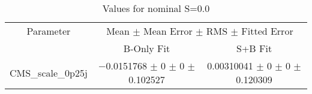 \begin{table}
\centering
\caption{Values for nominal S=0.0}
\begin{tabular}{ccc}
\toprule
Parameter & \multicolumn{2}{c}{Mean $\pm$ Mean Error $\pm$ RMS $\pm$ Fitted Error}\\
 & B-Only Fit & S+B Fit\\
\midrule
CMS\_scale\_0p25j & \num{-0.0151768} $\pm$ \num{0} $\pm$ \num{0} $\pm$ \num{0.102527} & \num{0.00310041} $\pm$ \num{0} $\pm$ \num{0} $\pm$ \num{0.120309}\\
\bottomrule
\end{tabular}
\end{table}
